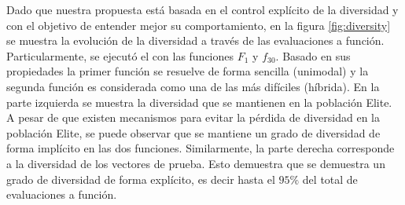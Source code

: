 Dado que nuestra propuesta está basada en el control explícito de la diversidad y con el objetivo de entender mejor su comportamiento, en la figura \ref{fig:diversity} se muestra la evolución de la diversidad a través de las evaluaciones a función.
%
Particularmente, se ejecutó el \DEEDM{} con las funciones $F_1$ y $f_{30}$.
%
Basado en sus propiedades la primer función se resuelve de forma sencilla (unimodal) y la segunda función es considerada como una de las más difíciles (híbrida).
%
En la parte izquierda se muestra la diversidad que se mantienen en la población Elite.
%
A pesar de que existen mecanismos para evitar la pérdida de diversidad en la población Elite, se puede observar que se mantiene un grado de diversidad de forma implícito en las dos funciones.
%
Similarmente, la parte derecha corresponde a la diversidad de los vectores de prueba.
%
Esto demuestra que se demuestra un grado de diversidad de forma explícito, es decir hasta el $95\%$ del total de evaluaciones a función.

